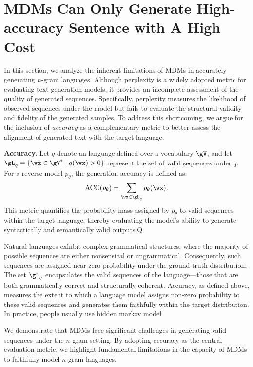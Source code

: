 \section{MDMs Can Only Generate High-accuracy Sentence with A High Cost}
\label{sec:negative}

In this section, we analyze the inherent limitations of MDMs in accurately generating $n$-gram languages. Although perplexity is a widely adopted metric for evaluating text generation models, it provides an incomplete assessment of the quality of generated sequences. Specifically, perplexity measures the likelihood of observed sequences under the model but fails to evaluate the structural validity and fidelity of the generated samples. To address this shortcoming, we argue for the inclusion of \textit{accuracy} as a complementary metric to better assess the alignment of generated text with the target language.

\textbf{Accuracy.} Let $q$ denote an language defined over a vocabulary $\gV$, and let $\gL_q = \{\vx \in \gV^* \mid q(\vx) > 0\}$ represent the set of valid sequences under $q$. For a reverse model $p_\mathsf{\theta}$, the generation accuracy is defined as:
\begin{equation*}
    \operatorname{ACC}(p_\mathsf{\theta}) = \sum_{\vx \in \gL_q} p_\mathsf{\theta}(\vx).
\end{equation*}
This metric quantifies the probability mass assigned by $p_\mathsf{\theta}$ to valid sequences within the target language, thereby evaluating the model’s ability to generate syntactically and semantically valid outputs.Q

Natural languages exhibit complex grammatical structures, where the majority of possible sequences are either nonsensical or ungrammatical. Consequently, such sequences are assigned near-zero probability under the ground-truth distribution. The set $\gL_q$ encapsulates the valid sequences of the language—those that are both grammatically correct and structurally coherent. Accuracy, as defined above, measures the extent to which a language model assigns non-zero probability to these valid sequences and generates them faithfully within the target distribution. In practice, people usually use hidden markov model

We demonstrate that MDMs face significant challenges in generating valid sequences under the $n$-gram setting. By adopting accuracy as the central evaluation metric, we highlight fundamental limitations in the capacity of MDMs to faithfully model $n$-gram languages.

